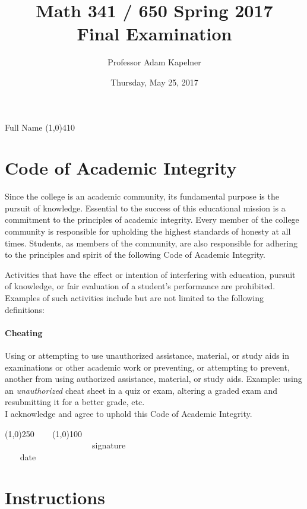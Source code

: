\documentclass[12pt]{article}
\title{Math 341 / 650 Spring 2017 \\ Final Examination}
\author{Professor Adam Kapelner}
\date{Thursday, May 25, 2017}
\begin{document}
\maketitle

\noindent Full Name \line(1,0){410}

\thispagestyle{empty}

\section*{Code of Academic Integrity}

\footnotesize
Since the college is an academic community, its fundamental purpose is the pursuit of knowledge. Essential to the success of this educational mission is a commitment to the principles of academic integrity. Every member of the college community is responsible for upholding the highest standards of honesty at all times. Students, as members of the community, are also responsible for adhering to the principles and spirit of the following Code of Academic Integrity.

Activities that have the effect or intention of interfering with education, pursuit of knowledge, or fair evaluation of a student's performance are prohibited. Examples of such activities include but are not limited to the following definitions:

\paragraph{Cheating} Using or attempting to use unauthorized assistance, material, or study aids in examinations or other academic work or preventing, or attempting to prevent, another from using authorized assistance, material, or study aids. Example: using an \emph{unauthorized} cheat sheet in a quiz or exam, altering a graded exam and resubmitting it for a better grade, etc.
\\

\noindent I acknowledge and agree to uphold this Code of Academic Integrity. \\

\begin{center}
\line(1,0){250} ~~~ \line(1,0){100}\\
~~~~~~~~~~~~~~~~~~~~~signature~~~~~~~~~~~~~~~~~~~~~~~~~~~~~~~~~~~~~~~~~~~~~ date
\end{center}

\normalsize

\section*{Instructions}
\end{document}
